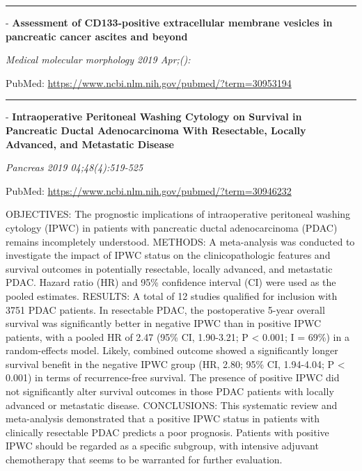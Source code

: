 \documentclass[]{article}
\begin{document}
{}

{}

\begin{center}\rule{0.5\linewidth}{\linethickness}\end{center}

 - \textbf{Assessment of CD133-positive extracellular membrane vesicles
in pancreatic cancer ascites and beyond}

\emph{Medical molecular morphology 2019 Apr;():}

PubMed: \url{https://www.ncbi.nlm.nih.gov/pubmed/?term=30953194}

{}

{}

\begin{center}\rule{0.5\linewidth}{\linethickness}\end{center}

 - \textbf{Intraoperative Peritoneal Washing Cytology on Survival in
Pancreatic Ductal Adenocarcinoma With Resectable, Locally Advanced, and
Metastatic Disease}

\emph{Pancreas 2019 04;48(4):519-525}

PubMed: \url{https://www.ncbi.nlm.nih.gov/pubmed/?term=30946232}

OBJECTIVES: The prognostic implications of intraoperative peritoneal
washing cytology (IPWC) in patients with pancreatic ductal
adenocarcinoma (PDAC) remains incompletely understood. METHODS: A
meta-analysis was conducted to investigate the impact of IPWC status on
the clinicopathologic features and survival outcomes in potentially
resectable, locally advanced, and metastatic PDAC. Hazard ratio (HR) and
95\% confidence interval (CI) were used as the pooled estimates.
RESULTS: A total of 12 studies qualified for inclusion with 3751 PDAC
patients. In resectable PDAC, the postoperative 5-year overall survival
was significantly better in negative IPWC than in positive IPWC
patients, with a pooled HR of 2.47 (95\% CI, 1.90-3.21; P \textless{}
0.001; I = 69\%) in a random-effects model. Likely, combined outcome
showed a significantly longer survival benefit in the negative IPWC
group (HR, 2.80; 95\% CI, 1.94-4.04; P \textless{} 0.001) in terms of
recurrence-free survival. The presence of positive IPWC did not
significantly alter survival outcomes in those PDAC patients with
locally advanced or metastatic disease. CONCLUSIONS: This systematic
review and meta-analysis demonstrated that a positive IPWC status in
patients with clinically resectable PDAC predicts a poor prognosis.
Patients with positive IPWC should be regarded as a specific subgroup,
with intensive adjuvant chemotherapy that seems to be warranted for
further evaluation.
\end{document}

